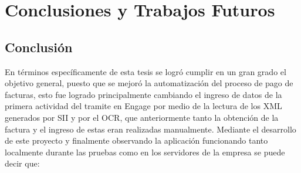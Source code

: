\chapter{Conclusiones y Trabajos Futuros}
\newpage
	\section{Conclusión}

	En términos específicamente de esta tesis se logró cumplir en un gran grado el objetivo general, puesto que se mejoró la automatización del proceso de pago de facturas, esto fue logrado principalmente cambiando el ingreso de datos de la primera actividad del tramite en Engage por medio de la lectura de los XML generados por SII y por el OCR, que anteriormente tanto la obtención de la factura y el ingreso de estas eran realizadas manualmente. Mediante el desarrollo de este proyecto y finalmente observando la aplicación funcionando tanto localmente durante las pruebas como en los servidores de la empresa se puede decir que:
	

